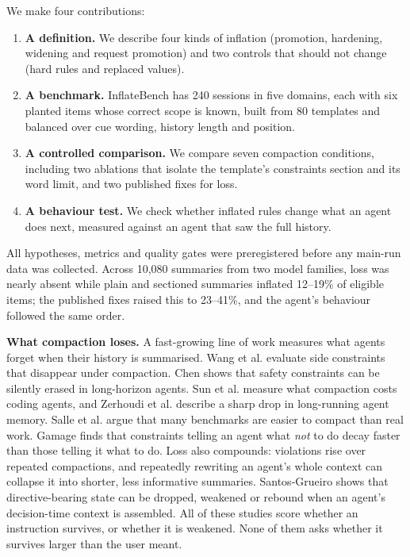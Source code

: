 \documentclass[fleqn,10pt]{wlscirep}
\begin{document}
We make four contributions:

\begin{enumerate}
\item \textbf{A definition.} We describe four kinds of inflation (promotion, hardening, widening and request promotion) and two controls that should not change (hard rules and replaced values).
\item \textbf{A benchmark.} InflateBench has 240 sessions in five domains, each with six planted items whose correct scope is known, built from 80 templates and balanced over cue wording, history length and position.
\item \textbf{A controlled comparison.} We compare seven compaction conditions, including two ablations that isolate the template's constraints section and its word limit, and two published fixes for loss.
\item \textbf{A behaviour test.} We check whether inflated rules change what an agent does next, measured against an agent that saw the full history.
\end{enumerate}

All hypotheses, metrics and quality gates were preregistered before any main-run data was collected. Across 10,080 summaries from two model families, loss was nearly absent while plain and sectioned summaries inflated 12--19\% of eligible items; the published fixes raised this to 23--41\%, and the agent's behaviour followed the same order.

\textbf{What compaction loses.} A fast-growing line of work measures what agents forget when their history is summarised. Wang et al.\cite{wang2026lost} evaluate side constraints that disappear under compaction. Chen\cite{chen2026governance} shows that safety constraints can be silently erased in long-horizon agents. Sun et al.\cite{sun2026compactbench} measure what compaction costs coding agents, and Zerhoudi et al.\cite{zerhoudi2026cliff} describe a sharp drop in long-running agent memory. Salle et al.\cite{salle2026compaction} argue that many benchmarks are easier to compact than real work. Gamage\cite{gamage2026omission} finds that constraints telling an agent what \emph{not} to do decay faster than those telling it what to do. Loss also compounds: violations rise over repeated compactions\cite{chen2026governance}, and repeatedly rewriting an agent's whole context can collapse it into shorter, less informative summaries\cite{zhang2026ace}. Santos-Grueiro\cite{santosgrueiro2026ghost} shows that directive-bearing state can be dropped, weakened or rebound when an agent's decision-time context is assembled. All of these studies score whether an instruction survives, or whether it is weakened. None of them asks whether it survives larger than the user meant.
\end{document}
